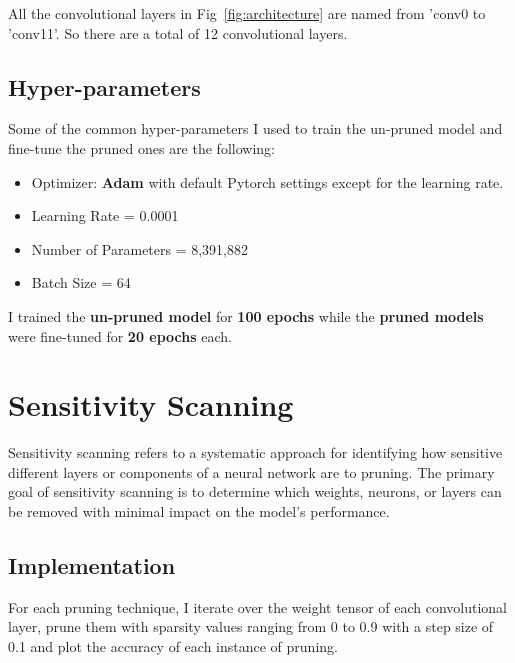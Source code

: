 \documentclass[12pt]{article}
\begin{document}
All the convolutional layers in Fig~\ref{fig:architecture} are named from 'conv0 to 'conv11'. So there are a total of 12 convolutional layers.

\subsection{Hyper-parameters}
Some of the common hyper-parameters I used to train the un-pruned model and fine-tune the pruned ones are the following:
\begin{itemize}
\item Optimizer: \textbf{Adam} with default Pytorch settings except for the learning rate.
\item Learning Rate = 0.0001
\item Number of Parameters = 8,391,882
\item Batch Size = 64
\end{itemize}

\noindent
I trained the \textbf{un-pruned model} for \textbf{100 epochs} while the \textbf{pruned models} were fine-tuned for \textbf{20 epochs} each. 

\section{Sensitivity Scanning}
Sensitivity scanning refers to a systematic approach for identifying how sensitive different layers or components of a neural network are to pruning. The primary goal of sensitivity scanning is to determine which weights, neurons, or layers can be removed with minimal impact on the model's performance.
\subsection{Implementation}
For each pruning technique, I iterate over the weight tensor of each convolutional layer, prune them with sparsity values ranging from 0 to 0.9 with a step size of 0.1 and plot the accuracy of each instance of pruning.
\end{document}
